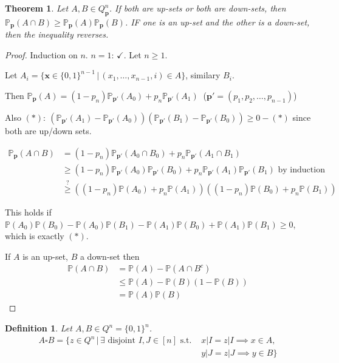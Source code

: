 \documentclass[a4paper]{article}
\newtheorem*{definition}{Definition}
\newtheorem{theorem}{Theorem}
\begin{document}
\begin{theorem}
	Let $A, B \in Q_\mathbf{p}^n$.
	If both are up-sets or both are down-sets,
	then $\mathbb{P}_\mathbf{p}(A \cap B) \geq \mathbb{P}_\mathbf{p}(A)\mathbb{P}_\mathbf{p}(B)$.
	IF one is an up-set and the other is a down-set, then the inequality reverses.
\end{theorem}
\begin{proof}
	Induction on $n$. $n=1$: $\checkmark$. Let $n \geq 1$.
	
	Let $A_i = \{\mathbf{x} \in \{0, 1\}^{n-1} \,|\, (x_1, \dots, x_{n-1} ,i) \in A\}$,
	similary $B_i$.
	
	Then $\mathbb{P}_\mathbf{p}(A) = (1-p_n)\mathbb{P}_\mathbf{p'}(A_0) + p_n\mathbb{P}_\mathbf{p'}(A_1)\ $
	($\mathbf{p'} = (p_1, p_2, \dots, p_{n-1})$)
	
	Also $(*):\ (\mathbb{P}_\mathbf{p'}(A_1)-\mathbb{P}_\mathbf{p'}(A_0))(\mathbb{P}_\mathbf{p'}(B_1)-\mathbb{P}_\mathbf{p'}(B_0)) \geq 0 - (*)$
	since both are up/down sets.
	
	\begin{align*}
		\mathbb{P}_\mathbf{p}(A \cap B) &= (1-p_n)\mathbb{P}_\mathbf{p'}(A_0 \cap B_0) + p_n\mathbb{P}_\mathbf{p'}(A_1 \cap B_1) \\
		&\geq (1-p_n)\mathbb{P}_\mathbf{p'}(A_0)\mathbb{P}_\mathbf{p'}(B_0) + p_n\mathbb{P}_\mathbf{p'}(A_1)\mathbb{P}_\mathbf{p'}(B_1) \text{ by induction} \\
		&\overset{?}{\geq} ((1-p_n)\mathbb{P}(A_0) + p_n\mathbb{P}(A_1))((1-p_n)\mathbb{P}(B_0)+p_n\mathbb{P}(B_1))
	\end{align*}
	
	This holds if $\mathbb{P}(A_0)\mathbb{P}(B_0)-\mathbb{P}(A_0)\mathbb{P}(B_1)-\mathbb{P}(A_1)\mathbb{P}(B_0)+\mathbb{P}(A_1)\mathbb{P}(B_1) \geq 0$,
	which is exactly $(*)$.
	
	If $A$ is an up-set, $B$ a down-set then
	\begin{align*}
		\mathbb{P}(A \cap B) &= \mathbb{P}(A) - \mathbb{P}(A\cap B^c) \\
		&\leq \mathbb{P}(A)-\mathbb{P}(B)(1-\mathbb{P}(B)) \\
		&= \mathbb{P}(A) \mathbb{P}(B)
	\end{align*}
\end{proof}

\begin{definition}
	Let $A, B \in Q^n = \{0, 1\}^n$.
	\begin{align*}
		A \square B = \{z \in Q^n \,|\, \exists \text{ disjoint } I, J \in [n] \text{ s.t. } &x|I = z|I \implies x\in A,\\ \, &y|J = z|J \implies y \in B \}
	\end{align*}
\end{definition}
\end{document}
